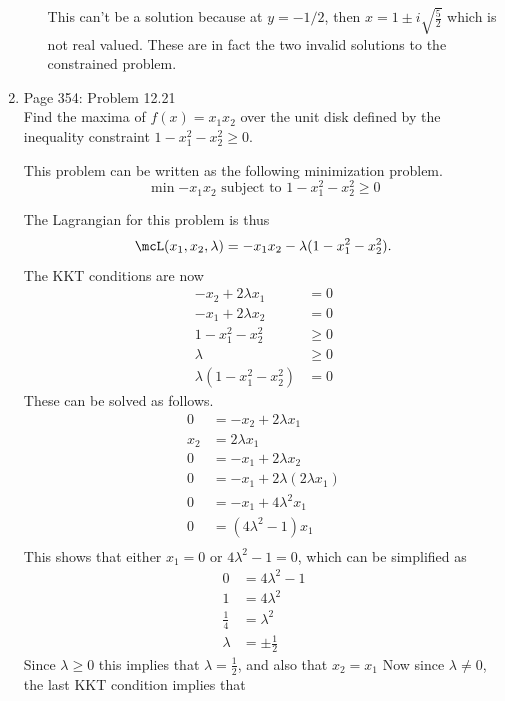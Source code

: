 \documentclass[11pt, oneside]{article}
\begin{document}
\begin{enumerate}
\begin{enumerate}
        This can't be a solution because at $y = -1/2$, then
        $x = 1 \pm i \sqrt{\frac{5}{2}}$ which is not real valued.
        These are in fact the two invalid solutions to the constrained problem.
    \end{enumerate}

  \item %
    Page 354: Problem 12.21 \\
    Find the maxima of $f(x) = x_1 x_2$ over the unit disk defined by the
    inequality constraint $1 - x_1^2 - x_2^2 \ge 0$.

    This problem can be written as the following minimization problem.
    \[
      \min{-x_1 x_2} \text{ subject to } 1 - x_1^2 - x_2^2 \ge 0
    \]

    The Lagrangian for this problem is thus
    \[
      \mcL(x_1, x_2, \lambda) = -x_1 x_2 - \lambda (1 - x_1^2 - x_2^2).
    \]
    The KKT conditions are now
    \begin{align*}
      -x_2 + 2\lambda x_1 &= 0 \\
      -x_1 + 2\lambda x_2 &= 0 \\
      1 - x_1^2 - x_2^2 &\ge 0 \\
      \lambda &\ge 0 \\
      \lambda (1 - x_1^2 - x_2^2) &= 0
    \end{align*}
    These can be solved as follows.
    \begin{align*}
      0 &= -x_2 + 2\lambda x_1 \\
      x_2 &= 2\lambda x_1 \\
      0 &= -x_1 + 2\lambda x_2 \\
      0 &= -x_1 + 2\lambda (2\lambda x_1) \\
      0 &= -x_1 + 4\lambda^2 x_1 \\
      0 &= (4\lambda^2 - 1) x_1 \\
    \end{align*}
    This shows that either $x_1 = 0$ or $4\lambda^2 - 1 = 0$, which can be
    simplified as
    \begin{align*}
      0 &= 4\lambda^2 - 1 \\
      1 &= 4\lambda^2 \\
      \frac{1}{4} &= \lambda^2 \\
      \lambda &= \pm \frac{1}{2}
    \end{align*}
    Since $\lambda \ge 0$ this implies that $\lambda = \frac{1}{2}$, and also
    that $x_2 = x_1$
    Now since $\lambda \neq 0$, the last KKT condition implies that

\end{enumerate}
\end{document}
